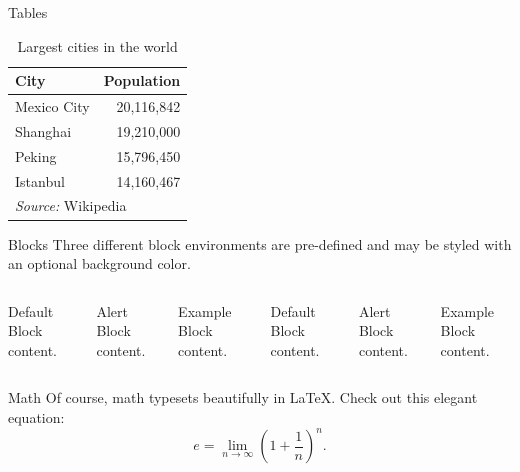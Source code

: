 \documentclass{beamer}
\begin{document}
\begin{frame}{Tables}
  \begin{table}
    \caption{Largest cities in the world}
    \begin{tabular}{lr}
      \toprule
      City & Population\\
      \midrule
      Mexico City & 20,116,842\\
      Shanghai & 19,210,000\\
      Peking & 15,796,450\\
      Istanbul & 14,160,467\\
      \bottomrule
      \multicolumn{2}{l}{\footnotesize{\textit{Source:} Wikipedia}}
    \end{tabular}
  \end{table}
\end{frame}
\begin{frame}{Blocks}
  Three different block environments are pre-defined and may be styled with an
  optional background color.

  \begin{columns}[T,onlytextwidth]
      \begin{block}{Default}
        Block content.
      \end{block}

      \begin{alertblock}{Alert}
        Block content.
      \end{alertblock}

      \begin{exampleblock}{Example}
        Block content.
      \end{exampleblock}



      \begin{block}{Default}
        Block content.
      \end{block}

      \begin{alertblock}{Alert}
        Block content.
      \end{alertblock}

      \begin{exampleblock}{Example}
        Block content.
      \end{exampleblock}

  \end{columns}
\end{frame}
\begin{frame}{Math}
Of course, math typesets beautifully in LaTeX. Check out this elegant equation:
  \begin{equation*}
    e = \lim_{n\to \infty} \left(1 + \frac{1}{n}\right)^n .
  \end{equation*}
\end{frame}
\end{document}
